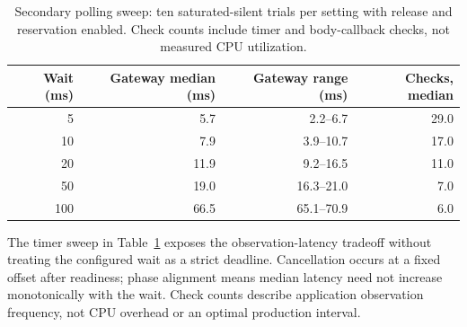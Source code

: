 \begin{table}[ht]\centering\small\begin{tabular}{@{}rrrr@{}}\toprule Wait (ms) & Gateway median (ms) & Gateway range (ms) & Checks, median\\\midrule
5 & 5.7 & 2.2--6.7 & 29.0 \\
10 & 7.9 & 3.9--10.7 & 17.0 \\
20 & 11.9 & 9.2--16.5 & 11.0 \\
50 & 19.0 & 16.3--21.0 & 7.0 \\
100 & 66.5 & 65.1--70.9 & 6.0 \\
\bottomrule\end{tabular}\caption{Secondary polling sweep: ten saturated-silent trials per setting with release and reservation enabled. Check counts include timer and body-callback checks, not measured CPU utilization.}\label{tab:poll}\end{table}
The timer sweep in Table~\ref{tab:poll} exposes the observation-latency tradeoff without treating the configured wait as a strict deadline. Cancellation occurs at a fixed offset after readiness; phase alignment means median latency need not increase monotonically with the wait. Check counts describe application observation frequency, not CPU overhead or an optimal production interval.
